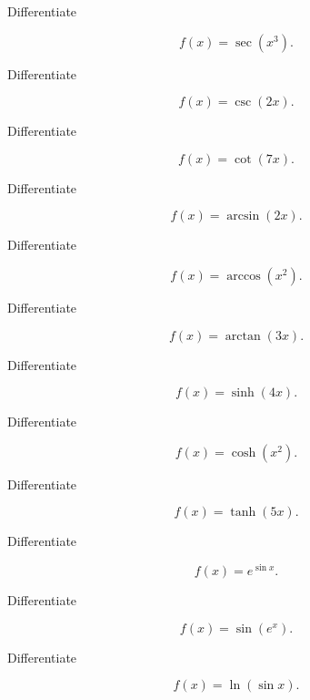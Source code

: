 \begin{exercise}[2]
Differentiate

\[
f(x)=\sec(x^3).
\]
\end{exercise}

\begin{exercise}[2]
Differentiate

\[
f(x)=\csc(2x).
\]
\end{exercise}

\begin{exercise}[2]
Differentiate

\[
f(x)=\cot(7x).
\]
\end{exercise}

\begin{exercise}[2]
Differentiate

\[
f(x)=\arcsin(2x).
\]
\end{exercise}

\begin{exercise}[2]
Differentiate

\[
f(x)=\arccos(x^2).
\]
\end{exercise}

\begin{exercise}[2]
Differentiate

\[
f(x)=\arctan(3x).
\]
\end{exercise}

\begin{exercise}[2]
Differentiate

\[
f(x)=\sinh(4x).
\]
\end{exercise}

\begin{exercise}[2]
Differentiate

\[
f(x)=\cosh(x^2).
\]
\end{exercise}

\begin{exercise}[2]
Differentiate

\[
f(x)=\tanh(5x).
\]
\end{exercise}

\begin{exercise}[2]
Differentiate

\[
f(x)=e^{\sin x}.
\]
\end{exercise}

\begin{exercise}[2]
Differentiate

\[
f(x)=\sin(e^x).
\]
\end{exercise}

\begin{exercise}[2]
Differentiate

\[
f(x)=\ln(\sin x).
\]
\end{exercise}

